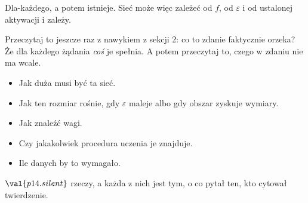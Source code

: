 \begin{fr}
\begin{ansblock}
Dla-każdego, a potem istnieje. Sieć może więc zależeć od $f$, od
$\varepsilon$ i od ustalonej aktywacji \dash{} i zależy.
\end{ansblock}

Przeczytaj to jeszcze raz z nawykiem z sekcji 2: co to zdanie faktycznie
orzeka? Że dla każdego żądania \emph{coś} je spełnia. A potem przeczytaj to,
czego w zdaniu nie ma wcale.

\begin{itemize}
\item Jak duża musi być ta sieć.
\item Jak ten rozmiar rośnie, gdy $\varepsilon$ maleje albo gdy obszar
  zyskuje wymiary.
\item Jak znaleźć wagi.
\item Czy jakakolwiek procedura uczenia je znajduje.
\item Ile danych by to wymagało.
\end{itemize}

$\val{p14.silent}$ rzeczy, a każda z nich jest tym, o co pytał ten, kto
cytował twierdzenie.

\end{fr}

